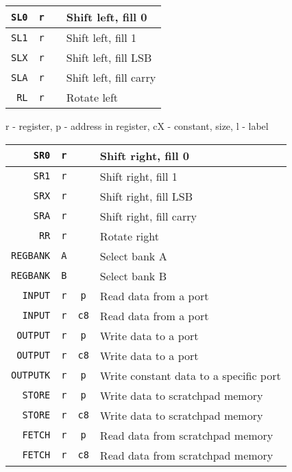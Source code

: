 \begin{table}[H]
\begin{tabular}{| r | c | c | l |}
\verb|SL0|&\verb|r|&\verb||& Shift left, fill 0 \\ \hline
\verb|SL1|&\verb|r|&\verb||& Shift left, fill 1 \\ \hline
\verb|SLX|&\verb|r|&\verb||& Shift left, fill LSB \\ \hline
\verb|SLA|&\verb|r|&\verb||& Shift left, fill carry \\ \hline
\verb|RL|&\verb|r|&\verb||& Rotate left \\ \hline
\end{tabular}
\end{table}

\begin{table}[H]
\centering
r - register, p - address in register, cX - constant, size, l - label
\begin{tabular}{| r | c | c | l |}\hline
\verb|SR0|&\verb|r|&\verb||& Shift right, fill 0 \\ \hline
\verb|SR1|&\verb|r|&\verb||& Shift right, fill 1 \\ \hline
\verb|SRX|&\verb|r|&\verb||& Shift right, fill LSB \\ \hline
\verb|SRA|&\verb|r|&\verb||& Shift right, fill carry \\ \hline
\verb|RR|&\verb|r|&\verb||& Rotate right \\ \hline

\verb|REGBANK|&\verb|A|&\verb||& Select bank A \\ \hline
\verb|REGBANK|&\verb|B|&\verb||& Select bank B \\ \hline

\verb|INPUT|&\verb|r|&\verb|p|& Read data from a port \\ \hline
\verb|INPUT|&\verb|r|&\verb|c8|& Read data from a port \\ \hline
\verb|OUTPUT|&\verb|r|&\verb|p|& Write data to a port \\ \hline
\verb|OUTPUT|&\verb|r|&\verb|c8|& Write data to a port \\ \hline
\verb|OUTPUTK|&\verb|r|&\verb|p|& Write constant data to a specific port\\ \hline

\verb|STORE|&\verb|r|&\verb|p|& Write data to scratchpad memory \\ \hline
\verb|STORE|&\verb|r|&\verb|c8|& Write data to scratchpad memory \\ \hline
\verb|FETCH|&\verb|r|&\verb|p|& Read data from scratchpad memory \\ \hline
\verb|FETCH|&\verb|r|&\verb|c8|& Read data from scratchpad memory \\ \hline


\end{tabular}
\end{table}
